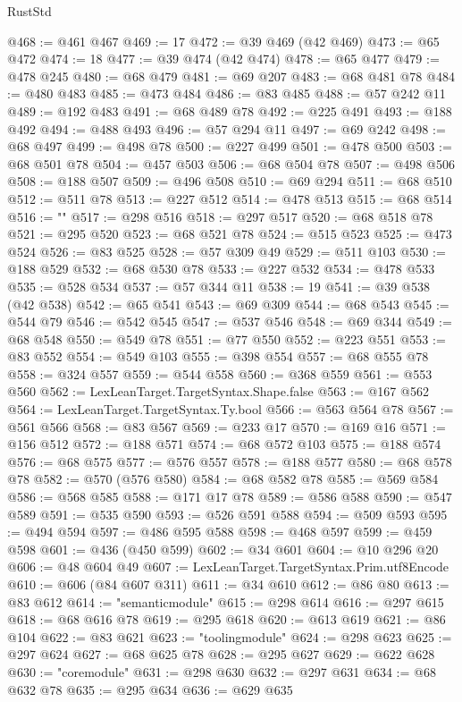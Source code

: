 \begin{lexlean}{RustStd}
\begin{coremodule}
{@468 := @461 @467
@469 := 17
@472 := @39 @469 (@42 @469)
@473 := @65 @472
@474 := 18
@477 := @39 @474 (@42 @474)
@478 := @65 @477
@479 := @478 @245
@480 := @68 @479
@481 := @69 @207
@483 := @68 @481 @78
@484 := @480 @483
@485 := @473 @484
@486 := @83 @485
@488 := @57 @242 @11
@489 := @192 @483
@491 := @68 @489 @78
@492 := @225 @491
@493 := @188 @492
@494 := @488 @493
@496 := @57 @294 @11
@497 := @69 @242
@498 := @68 @497
@499 := @498 @78
@500 := @227 @499
@501 := @478 @500
@503 := @68 @501 @78
@504 := @457 @503
@506 := @68 @504 @78
@507 := @498 @506
@508 := @188 @507
@509 := @496 @508
@510 := @69 @294
@511 := @68 @510
@512 := @511 @78
@513 := @227 @512
@514 := @478 @513
@515 := @68 @514
@516 := "{"
@517 := @298 @516
@518 := @297 @517
@520 := @68 @518 @78
@521 := @295 @520
@523 := @68 @521 @78
@524 := @515 @523
@525 := @473 @524
@526 := @83 @525
@528 := @57 @309 @49
@529 := @511 @103
@530 := @188 @529
@532 := @68 @530 @78
@533 := @227 @532
@534 := @478 @533
@535 := @528 @534
@537 := @57 @344 @11
@538 := 19
@541 := @39 @538 (@42 @538)
@542 := @65 @541
@543 := @69 @309
@544 := @68 @543
@545 := @544 @79
@546 := @542 @545
@547 := @537 @546
@548 := @69 @344
@549 := @68 @548
@550 := @549 @78
@551 := @77 @550
@552 := @223 @551
@553 := @83 @552
@554 := @549 @103
@555 := @398 @554
@557 := @68 @555 @78
@558 := @324 @557
@559 := @544 @558
@560 := @368 @559
@561 := @553 @560
@562 := LexLeanTarget.TargetSyntax.Shape.false
@563 := @167 @562
@564 := LexLeanTarget.TargetSyntax.Ty.bool
@566 := @563 @564 @78
@567 := @561 @566
@568 := @83 @567
@569 := @233 @17
@570 := @169 @16
@571 := @156 @512
@572 := @188 @571
@574 := @68 @572 @103
@575 := @188 @574
@576 := @68 @575
@577 := @576 @557
@578 := @188 @577
@580 := @68 @578 @78
@582 := @570 (@576 @580)
@584 := @68 @582 @78
@585 := @569 @584
@586 := @568 @585
@588 := @171 @17 @78
@589 := @586 @588
@590 := @547 @589
@591 := @535 @590
@593 := @526 @591 @588
@594 := @509 @593
@595 := @494 @594
@597 := @486 @595 @588
@598 := @468 @597
@599 := @459 @598
@601 := @436 (@450 @599)
@602 := @34 @601
@604 := @10 @296 @20
@606 := @48 @604 @49
@607 := LexLeanTarget.TargetSyntax.Prim.utf8Encode
@610 := @606 (@84 @607 @311)
@611 := @34 @610
@612 := @86 @80
@613 := @83 @612
@614 := "semanticmodule"
@615 := @298 @614
@616 := @297 @615
@618 := @68 @616 @78
@619 := @295 @618
@620 := @613 @619
@621 := @86 @104
@622 := @83 @621
@623 := "toolingmodule"
@624 := @298 @623
@625 := @297 @624
@627 := @68 @625 @78
@628 := @295 @627
@629 := @622 @628
@630 := "coremodule"
@631 := @298 @630
@632 := @297 @631
@634 := @68 @632 @78
@635 := @295 @634
@636 := @629 @635
}}
\end{coremodule}
\end{lexlean}
